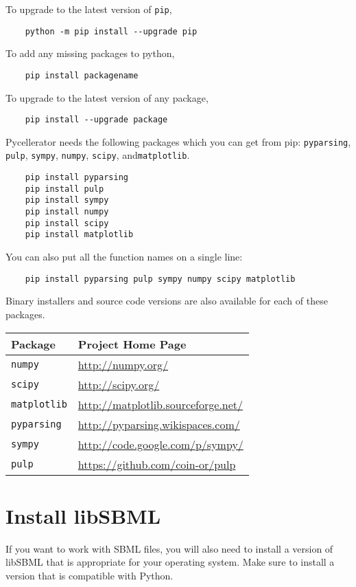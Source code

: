 To upgrade to the latest version of {\tt pip},
\begin{verbatim}
    python -m pip install --upgrade pip
\end{verbatim}
To add any missing packages to python, 
\begin{verbatim}
    pip install packagename
\end{verbatim}
To upgrade to the latest version of any package,
\begin{verbatim}
    pip install --upgrade package
\end{verbatim}
Pycellerator needs the following packages which you can get from pip: {\tt pyparsing}, {\tt pulp}, {\tt sympy}, {\tt numpy}, {\tt scipy}, and{\tt matplotlib}.
\begin{verbatim}
    pip install pyparsing
    pip install pulp
    pip install sympy
    pip install numpy
    pip install scipy
    pip install matplotlib
\end{verbatim}
You can also put all the function names on a single line:
\begin{verbatim}
    pip install pyparsing pulp sympy numpy scipy matplotlib
\end{verbatim}
Binary installers and source code versions are also available for each of these packages. 

\begin{center}
\begin{tabular}{|ll|}
\hline
\textbf{Package} & \textbf{Project Home Page} \\ 
\hline
{\tt numpy} & \url{http://numpy.org/}\\
{\tt scipy} & \url{http://scipy.org/}\\
{\tt matplotlib}  & \url{http://matplotlib.sourceforge.net/}\\
{\tt pyparsing} & \url{http://pyparsing.wikispaces.com/} \\
{\tt sympy} &  \url{http://code.google.com/p/sympy/} \\
{\tt pulp} & \url{https://github.com/coin-or/pulp}\\

\hline
\end{tabular}
\end{center}


\section{Install libSBML}

If you want to work with SBML files, you will also need to install a version of libSBML that is appropriate for your operating system. Make sure to install a version that is compatible with Python. 

